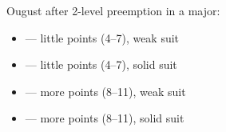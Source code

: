 Ougust \ctr{2\nt} after 2-level preemption in a major:
\begin{itemize}
    \item \ctr{3\c} --- little points (4--7), weak suit
    \item \ctr{3\d} --- little points (4--7), solid suit
    \item \ctr{3\h} --- more points (8--11), weak suit
    \item \ctr{3\s} --- more points (8--11), solid suit
\end{itemize}
